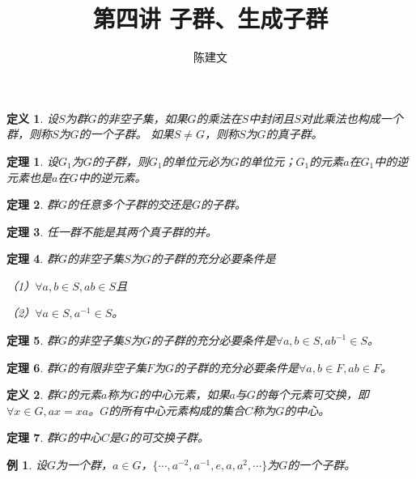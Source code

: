 \documentclass{article}
\newtheorem{Def}{定义}
\newtheorem{Thm}{定理}
\newtheorem*{Example}{例}
\begin{document}
\begin{CJK*}{UTF8}{gbsn}
  \title{第四讲 子群、生成子群}
  \author{陈建文}
  \maketitle
 \begin{Def}
  设$S$为群$G$的非空子集，如果$G$的乘法在$S$中封闭且$S$对此乘法也构成一个群，则称$S$为$G$的一个子群。
  如果$S\neq G$，则称$S$为$G$的真子群。
 \end{Def} 

 \begin{Thm}
  设$G_1$为$G$的子群，则$G_1$的单位元必为$G$的单位元；$G_1$的元素$a$在$G_1$中的逆元素也是$a$在$G$中的逆元素。
 \end{Thm}

 \begin{Thm}
  群$G$的任意多个子群的交还是$G$的子群。
 \end{Thm}

 \begin{Thm}
  任一群不能是其两个真子群的并。
 \end{Thm}

 \begin{Thm}
  群$G$的非空子集$S$为$G$的子群的充分必要条件是

  （1）$\forall a,b\in S, ab\in S$且

  （2）$\forall a\in S, a^{-1}\in S$。
 \end{Thm}

 \begin{Thm}
  群$G$的非空子集$S$为$G$的子群的充分必要条件是$\forall a,b\in S, ab^{-1}\in S$。
 \end{Thm}


 \begin{Thm}
  群$G$的有限非空子集$F$为$G$的子群的充分必要条件是$\forall a,b\in F, ab\in F$。
 \end{Thm}

 \begin{Def}
  群$G$的元素$a$称为$G$的中心元素，如果$a$与$G$的每个元素可交换，即$\forall x\in G, ax=xa$。$G$的所有中心元素构成的集合$C$称为$G$的中心。
 \end{Def}
 \begin{Thm}
  群$G$的中心$C$是$G$的可交换子群。
 \end{Thm}

\begin{Example}
  设$G$为一个群，$a\in G$，$\{\cdots,a^{-2},a^{-1},e,a,a^2,\cdots\}$为$G$的一个子群。
\end{Example}


\end{CJK*}
\end{document}
